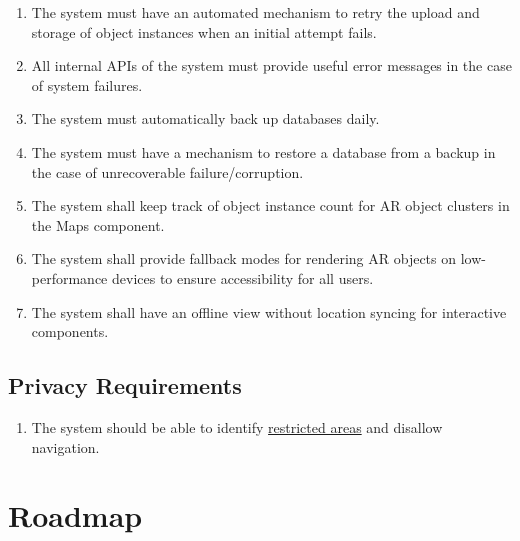 \documentclass{article}
\begin{document}
\begin{enumerate}[label=\textbf{ROR-\arabic*},ref=ROR-\arabic*]
    \item \label{ROR-1} The system must have an automated mechanism to retry the upload and storage of object instances when an initial attempt fails. \\
    \item \label{ROR-2} All internal APIs of the system must provide useful error messages in the case of system failures. \\
    \item \label{ROR-3} The system must automatically back up databases daily. \\
    \item \label{ROR-4} The system must have a mechanism to restore a database from a backup in the case of unrecoverable failure/corruption. \\
    \item \label{ROR-5} The system shall keep track of object instance count for AR object clusters in the Maps component. \\
    \item \label{ROR-6} The system shall provide fallback modes for rendering AR objects on low-performance devices to ensure accessibility for all users. \\
    \item \label{ROR-7} The system shall have an offline view without location syncing for interactive components. \\
\end{enumerate}

\subsection{Privacy Requirements}

\begin{enumerate}[label=\textbf{PVR-\arabic*},ref=PVR-\arabic*]
    \item \label{PVR-1} The system should be able to identify \hyperref[ssub:def]{restricted areas} and disallow navigation.\\
\end{enumerate}

\section{Roadmap}
\end{document}
